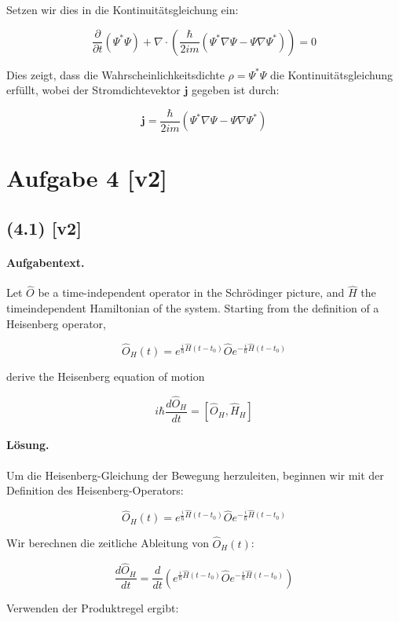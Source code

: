 \documentclass[11pt,a4paper]{article}
\begin{document}
Setzen wir dies in die Kontinuitätsgleichung ein:

\[
\frac{\partial}{\partial t} (\Psi^* \Psi) + \nabla \cdot \left(\frac{\hbar}{2 i m} \left(\Psi^* \nabla \Psi - \Psi \nabla \Psi^*\right)\right) = 0
\]

Dies zeigt, dass die Wahrscheinlichkeitsdichte \(\rho = \Psi^* \Psi\) die Kontinuitätsgleichung erfüllt, wobei der Stromdichtevektor \(\mathbf{j}\) gegeben ist durch:

\[
\mathbf{j} = \frac{\hbar}{2 i m} \left(\Psi^* \nabla \Psi - \Psi \nabla \Psi^*\right)
\]

\section*{Aufgabe 4 [v2]}
\subsection*{(4.1) [v2]}
\paragraph{Aufgabentext.}
Let $\hat{O}$ be a time-independent operator in the Schrödinger picture, and $\hat{H}$ the timeindependent Hamiltonian of the system. Starting from the definition of a Heisenberg operator,

$$
\hat{O}_H(t)=e^{\frac{i}{\hbar} \hat{H}\left(t-t_0\right)} \hat{O} e^{-\frac{i}{\hbar} \hat{H}\left(t-t_0\right)}
$$

derive the Heisenberg equation of motion

$$
i \hbar \frac{d \hat{O}_H}{d t}=\left[\hat{O}_H, \hat{H}_H\right]
$$

\paragraph{Lösung.}
Um die Heisenberg-Gleichung der Bewegung herzuleiten, beginnen wir mit der Definition des Heisenberg-Operators:

\[
\hat{O}_H(t) = e^{\frac{i}{\hbar} \hat{H}(t-t_0)} \hat{O} e^{-\frac{i}{\hbar} \hat{H}(t-t_0)}
\]

Wir berechnen die zeitliche Ableitung von \(\hat{O}_H(t)\):

\[
\frac{d \hat{O}_H}{d t} = \frac{d}{d t} \left( e^{\frac{i}{\hbar} \hat{H}(t-t_0)} \hat{O} e^{-\frac{i}{\hbar} \hat{H}(t-t_0)} \right)
\]

Verwenden der Produktregel ergibt:
\end{document}
